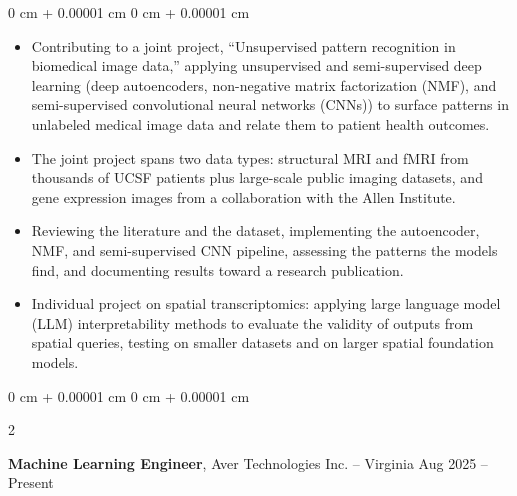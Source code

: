 \documentclass[10pt, letterpaper]{article}
\newenvironment{highlights}{
    \begin{itemize}[
        topsep=0.3 cm,
        parsep=0.05 cm,
        partopsep=0pt,
        itemsep=0.02 cm,
        leftmargin=0 cm + 10pt
    ]
}{
    \end{itemize}
} %
\newenvironment{onecolentry}{
    \begin{adjustwidth}{
        0 cm + 0.00001 cm
    }{
        0 cm + 0.00001 cm
    }
}{
    \end{adjustwidth}
} %
\newenvironment{twocolentry}[2][]{
    \onecolentry
    \def\secondColumn{#2}
    \setcolumnwidth{\fill, 4.5 cm}
    \begin{paracol}{2}
}{
    \switchcolumn \raggedleft \secondColumn
    \end{paracol}
    \endonecolentry
} %
\begin{document}
        \vspace{0.10 cm}
        \begin{onecolentry}
            \begin{highlights}
                \item Contributing to a joint project, ``Unsupervised pattern recognition in biomedical image data,'' applying unsupervised and semi-supervised deep learning (deep autoencoders, non-negative matrix factorization (NMF), and semi-supervised convolutional neural networks (CNNs)) to surface patterns in unlabeled medical image data and relate them to patient health outcomes.
                \item The joint project spans two data types: structural MRI and fMRI from thousands of UCSF patients plus large-scale public imaging datasets, and gene expression images from a collaboration with the Allen Institute.
                \item Reviewing the literature and the dataset, implementing the autoencoder, NMF, and semi-supervised CNN pipeline, assessing the patterns the models find, and documenting results toward a research publication.
                \item Individual project on spatial transcriptomics: applying large language model (LLM) interpretability methods to evaluate the validity of outputs from spatial queries, testing on smaller datasets and on larger spatial foundation models.
            \end{highlights}
        \end{onecolentry}

        \vspace{0.10 cm}

        \begin{twocolentry}{
            Aug 2025 – Present
        }
            \textbf{Machine Learning Engineer}, Aver Technologies Inc. -- Virginia\end{twocolentry}
\end{document}
